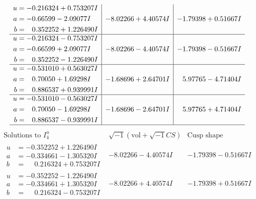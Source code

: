 \documentclass[1p]{elsarticle_modified}
\theoremstyle{definition}
\newcommand{\I}{\sqrt{-1}}
\begin{document}
$$\begin{array}{c|c|c}
\begin{aligned}
u &= -0.216324 + 0.753207 I \\
a &= -0.66599 - 2.09077 I \\
b &= \phantom{-}0.352252 + 1.226490 I\end{aligned}
 & -8.02266 + 4.40574 I & -1.79398 + 0.51667 I \\ \hline\begin{aligned}
u &= -0.216324 - 0.753207 I \\
a &= -0.66599 + 2.09077 I \\
b &= \phantom{-}0.352252 - 1.226490 I\end{aligned}
 & -8.02266 - 4.40574 I & -1.79398 - 0.51667 I \\ \hline\begin{aligned}
u &= -0.531010 + 0.563027 I \\
a &= \phantom{-}0.70050 + 1.69298 I \\
b &= \phantom{-}0.886537 + 0.939991 I\end{aligned}
 & -1.68696 + 2.64701 I & \phantom{-}5.97765 - 4.71404 I \\ \hline\begin{aligned}
u &= -0.531010 - 0.563027 I \\
a &= \phantom{-}0.70050 - 1.69298 I \\
b &= \phantom{-}0.886537 - 0.939991 I\end{aligned}
 & -1.68696 - 2.64701 I & \phantom{-}5.97765 + 4.71404 I\\
 \hline 
 \end{array}$$\newpage$$\begin{array}{c|c|c}  
\text{Solutions to }I^u_{4}& \I (\text{vol} + \sqrt{-1}CS) & \text{Cusp shape}\\
 \hline 
\begin{aligned}
u &= -0.352252 + 1.226490 I \\
a &= -0.334661 - 1.305320 I \\
b &= \phantom{-}0.216324 + 0.753207 I\end{aligned}
 & -8.02266 - 4.40574 I & -1.79398 - 0.51667 I \\ \hline\begin{aligned}
u &= -0.352252 - 1.226490 I \\
a &= -0.334661 + 1.305320 I \\
b &= \phantom{-}0.216324 - 0.753207 I\end{aligned}
 & -8.02266 + 4.40574 I & -1.79398 + 0.51667 I \\ \hline\begin{aligned}

\end{aligned}
\end{array}$$
\end{document}

